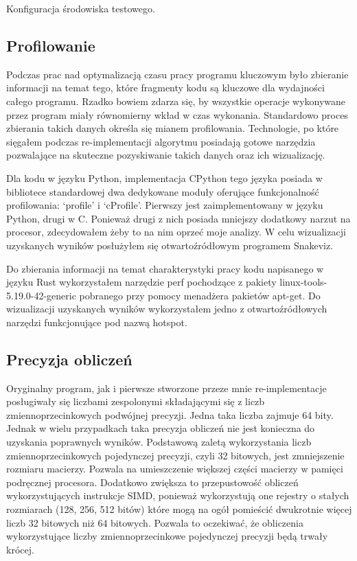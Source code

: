 \documentclass[11pt, a4paper]{article}
\begin{document}
\begin{sloppypar}
    \FloatBarrier
    \begin{table}[ht]
      \centering
      
      \caption{Konfiguracja środowiska testowego.}
      \label{pc-configuration}
    \end{table}
    \FloatBarrier

    \subsection{Profilowanie}
    Podczas prac nad optymalizacją czasu pracy programu kluczowym było zbieranie
    informacji na temat tego, które fragmenty kodu są kluczowe dla wydajności całego programu.
    Rzadko bowiem zdarza się, by wszystkie operacje wykonywane przez program miały równomierny
    wkład w czas wykonania. Standardowo proces zbierania takich danych określa się
    mianem profilowania. Technologie, po które sięgałem podczas re-implementacji
    algorytmu posiadają gotowe narzędzia pozwalające na skuteczne pozyskiwanie takich
    danych oraz ich wizualizację.

    Dla kodu w języku Python, implementacja CPython tego języka posiada w bibliotece standardowej
    dwa dedykowane moduły oferujące funkcjonalność profilowania: `profile' i `cProfile'.
    Pierwszy jest zaimplementowany w języku Python, drugi w C. Ponieważ drugi z nich posiada
    mniejszy dodatkowy narzut na procesor, zdecydowałem żeby to na nim oprzeć moje
    analizy. W celu wizualizacji uzyskanych wyników posłużyłem się otwartoźródłowym programem
    Snakeviz\cite{Snakeviz_PyPI}.

    Do zbierania informacji na temat charakterystyki pracy kodu napisanego w języku Rust
    wykorzystałem narzędzie perf pochodzące z pakiety linux-tools-5.19.0-42-generic pobranego
    przy pomocy menadżera pakietów apt-get. Do wizualizacji uzyskanych wyników
    wykorzystałem jedno z otwartoźródłowych narzędzi funkcjonujące pod nazwą hotspot\cite{HOTSPOT}.

    \subsection{Precyzja obliczeń}
    Oryginalny program, jak i pierwsze stworzone przeze mnie re-implementacje
    posługiwały się liczbami zespolonymi składającymi się z liczb zmiennoprzecinkowych
    podwójnej precyzji. Jedna taka liczba zajmuje 64 bity. Jednak w wielu przypadkach
    taka precyzja obliczeń nie jest konieczna do uzyskania poprawnych wyników. Podstawową
    zaletą wykorzystania liczb zmiennoprzecinkowych pojedynczej precyzji, czyli 32
    bitowych, jest zmniejszenie rozmiaru macierzy. Pozwala na umieszczenie większej
    części macierzy w pamięci podręcznej procesora. Dodatkowo zwiększa to przepustowość obliczeń
    wykorzystujących instrukcje SIMD, ponieważ wykorzystują one rejestry o stałych
    rozmiarach (128, 256, 512 bitów) które mogą na ogół pomieścić dwukrotnie więcej
    liczb 32 bitowych niż 64 bitowych. Pozwala to oczekiwać, że obliczenia
    wykorzystujące liczby zmiennoprzecinkowe pojedynczej precyzji będą trwały krócej.


\end{sloppypar}
\end{document}
